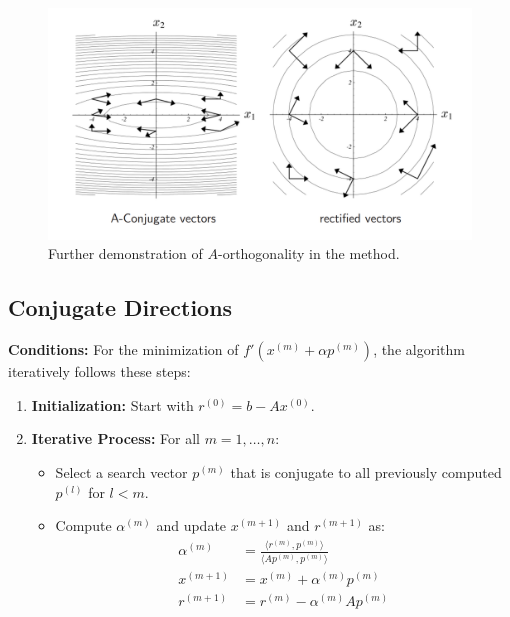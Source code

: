 \documentclass[unicode,11pt,a4paper,oneside,numbers=endperiod,openany]{scrartcl}
\begin{document}
\begin{figure}[H]
    \centering
    \includegraphics[trim=0cm 0cm 0cm 0cm, clip, width=15cm]{img9.png}
    \caption{Further demonstration of \( A \)-orthogonality in the method.}
    \label{fig:img9}
\end{figure}

\subsection{Conjugate Directions}

\textbf{Conditions:}
For the minimization of \( f'(x^{(m)} + \alpha p^{(m)}) \), the algorithm iteratively follows these steps:

\begin{enumerate}
    \item \textbf{Initialization:} Start with \( r^{(0)} = b - Ax^{(0)} \).

    \item \textbf{Iterative Process:} For all \( m = 1, \ldots, n \):
    \begin{itemize}
        \item Select a search vector \( p^{(m)} \) that is conjugate to all previously computed \( p^{(l)} \) for \( l < m \).
        \item Compute \( \alpha^{(m)} \) and update \( x^{(m+1)} \) and \( r^{(m+1)} \) as:
        \begin{align*}
            \alpha^{(m)} &= \frac{\langle r^{(m)}, p^{(m)} \rangle}{\langle Ap^{(m)}, p^{(m)} \rangle} \\
            x^{(m+1)} &= x^{(m)} + \alpha^{(m)} p^{(m)} \\
            r^{(m+1)} &= r^{(m)} - \alpha^{(m)} Ap^{(m)}
        \end{align*}
    \end{itemize}
\end{enumerate}
\end{document}
